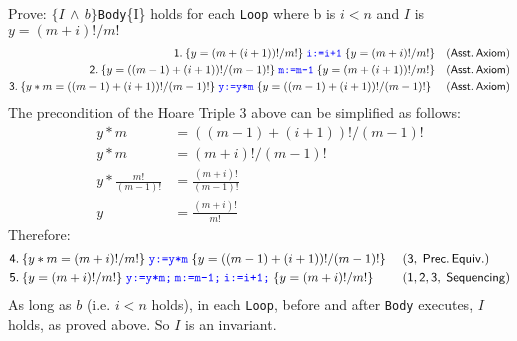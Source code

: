 Prove: \(\{I\,\land\,b\}\)\;\texttt{Body}\;\{I\} holds for each \texttt{Loop} where b is \(i < n\) and \(I\) is \(y=(m+i)!/m!\)
\begin{align*}
\mathsf{1.}\: \{y=(m+(i+1))!/m!\}\;\texttt{\textcolor{blue}{i:=i+1}}\;\{y = (m+i)!/m!\} && \mathsf{(Asst.\, Axiom)} \\
\mathsf{2.}\: \{y=((m-1)+(i+1))!/(m-1)!\}\;\texttt{\textcolor{blue}{m:=m-1}}\;\{y = (m+(i+1))!/m!\} && \mathsf{(Asst.\, Axiom)} \\
\mathsf{3.}\: \{y*m=((m-1)+(i+1))!/(m-1)!\}\;\texttt{\textcolor{blue}{y:=y*m}}\;\{y=((m-1)+(i+1))!/(m-1)!\}\ && \mathsf{(Asst.\, Axiom)} \\
\end{align*}
The precondition of the Hoare Triple 3 above can be simplified as follows:
\begin{align}
  y*m & =((m-1)+(i+1))!/(m-1)! \nonumber \\
  y*m & = (m+i)!/(m-1)! \nonumber \\
  y*\frac{m!}{(m-1)!} & = \frac{(m+i)!}{(m-1)!} \nonumber \\
  y & = \frac{(m+i)!}{m!}
\end{align}
Therefore:
\begin{align*}
& \mathsf{4.}\: \{y*m=(m+i)!/m!\}\;\texttt{\textcolor{blue}{y:=y*m}}\;\{y=((m-1)+(i+1))!/(m-1)!\}\ && \mathsf{(3,\;Prec.\, Equiv.)} \\
& \mathsf{5.}\: \{y=(m+i)!/m!\}\;\texttt{\textcolor{blue}{y:=y*m;\:m:=m-1;\:i:=i+1;}}\;\{y=(m+i)!/m!\}\ && \mathsf{(1,2,3,\;Sequencing)} \\
\end{align*}
As long as \(b\) (i.e. \( i < n\) holds), in each \texttt{Loop}, before and after \texttt{Body} executes, \(I\) holds, as proved above. So \(I\) is an invariant.
